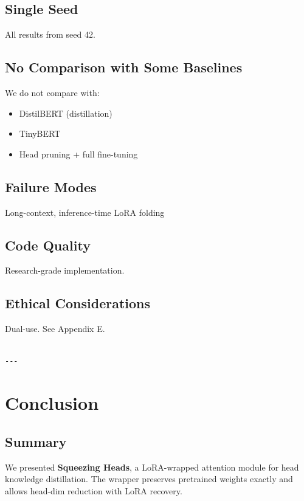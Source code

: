 \subsection{Single Seed}

All results from seed 42.

\subsection{No Comparison with Some Baselines}

We do not compare with:
\begin{itemize}
\item DistilBERT (distillation)
\item TinyBERT
\item Head pruning + full fine-tuning

\end{itemize}
\subsection{Failure Modes}

Long-context, inference-time LoRA folding

\subsection{Code Quality}

Research-grade implementation.

\subsection{Ethical Considerations}

Dual-use. See Appendix E.
\begin{lstlisting}

---
\end{lstlisting}


\section{Conclusion}

\subsection{Summary}

We presented \textbf{Squeezing Heads}, a LoRA-wrapped attention module for head 
knowledge distillation. The wrapper preserves pretrained weights exactly 
and allows head-dim reduction with LoRA recovery.

